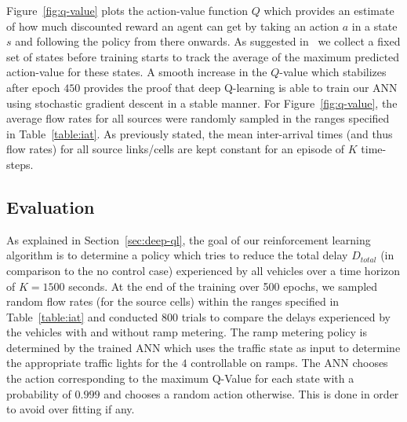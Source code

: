 \documentclass{sig-alternate-05-2015}
\begin{document}
Figure~\ref{fig:q-value} plots the action-value function $Q$ which provides an estimate of how much discounted reward an agent can get by taking an action $a$ in a state $s$ and following the policy from there onwards. As suggested in~\cite{mnih2015human} we collect a fixed set of states  before training starts to track the average of the maximum predicted action-value for these states. A smooth increase in the $Q$-value which stabilizes after epoch $450$ provides the proof that deep Q-learning is able to train our ANN using stochastic gradient descent in a stable manner. For Figure~\ref{fig:q-value}, the average flow rates for all sources were randomly sampled in the ranges specified in Table~\ref{table:iat}. As previously stated, the mean inter-arrival times (and thus flow rates) for all source links/cells are kept constant for an episode of $K$ time-steps.


\subsection{Evaluation}
\label{subsec:results}

As explained in Section~\ref{sec:deep-ql}, the goal of our reinforcement learning algorithm is to determine a policy which tries to reduce the total delay $D_{total}$ (in comparison to the no control case) experienced by all vehicles over a time horizon of $K=1500$ seconds. At the end of the training over 500 epochs, we sampled random flow rates (for the source cells) within the ranges specified in Table~\ref{table:iat} and conducted $800$ trials to compare the delays experienced by the vehicles with and without ramp metering. The ramp metering policy is determined by the trained ANN which uses the traffic state as input to determine the appropriate traffic lights for the $4$ controllable on ramps. The ANN chooses the action corresponding to the maximum Q-Value for each state with a probability of $0.999$ and chooses a random action otherwise. This is done in order to avoid over fitting if any.
\end{document}

